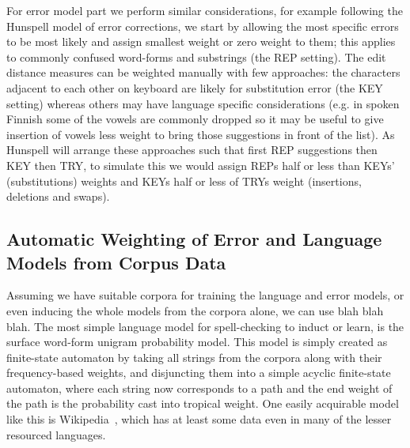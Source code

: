 \documentclass[a4paper,12pt]{article}
\begin{document}
For error model part we perform similar considerations, for example following
the Hunspell model of error corrections, we start by allowing the most
specific errors to be most likely and assign smallest weight or zero weight
to them; this applies to commonly confused word-forms and substrings (the REP
setting). The edit distance measures can be weighted manually with few
approaches: the characters adjacent to each other on keyboard are likely
for substitution error (the KEY setting) whereas others may have language
specific considerations (e.g. in spoken Finnish some of the vowels are commonly
dropped so it may be useful to give insertion of vowels less weight to bring
those suggestions in front of the list). As Hunspell will arrange these
approaches such that first REP suggestions then KEY then TRY, to simulate this
we would assign REPs half or less than KEYs' (substitutions) weights and
KEYs half or less of TRYs weight (insertions, deletions and swaps).

\subsection{Automatic Weighting of Error and Language Models from Corpus Data}
\label{subsec:automatic-weighting}

Assuming we have suitable corpora for training the language and error models,
or even inducing the whole models from the corpora alone, we can use blah blah
blah. The most simple language model for spell-checking to induct or learn, is
the surface word-form unigram probability model. This model is simply created
as finite-state automaton by taking all strings from the corpora along with
their frequency-based weights, and disjuncting them into a simple acyclic
finite-state automaton, where each string now corresponds to a path and the end
weight of the path is the probability cast into tropical weight. One easily
acquirable model like this is Wikipedia~\cite{pirinen/2010/lrec}, which has at
least some data even in many of the lesser resourced languages.
\end{document}
